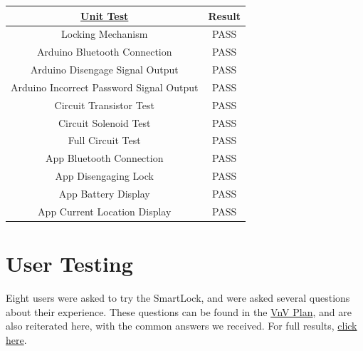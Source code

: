 \documentclass[12pt, titlepage]{article}
\begin{document}
\begin{center}

\begin{tabular}{|c|c|}
  \hline
  \textbf{\href{https://github.com/NevoAbigail/Capstone/blob/main/docs/VnVPlan/VnVPlan.pdf}{Unit Test}} & \textbf{Result} \\
  \hline
  Locking Mechanism & PASS\\
  \hline
  Arduino Bluetooth Connection & PASS\\
  \hline
  Arduino Disengage Signal Output & PASS\\
  \hline
  Arduino Incorrect Password Signal Output & PASS \\
  \hline
  Circuit Transistor Test & PASS \\
  \hline
  Circuit Solenoid Test & PASS \\
  \hline
  Full Circuit Test & PASS \\
  \hline
  App Bluetooth Connection & PASS \\
  \hline
  App Disengaging Lock & PASS \\
  \hline
  App Battery Display & PASS \\
  \hline
  App Current Location Display & PASS \\
  \hline
  
\end{tabular}
\end{center}

\section{User Testing} \label{User Testing}

Eight users were asked to try the SmartLock, and were asked several questions about their experience. These questions can be found in the \href{https://github.com/NevoAbigail/Capstone/blob/main/docs/VnVPlan/VnVPlan.pdf}{VnV Plan}, and are also reiterated here, with the common answers we received. For full results, \href{https://github.com/NevoAbigail/Capstone/blob/main/docs/VnVReport/UserTesting.xlsx}{click here}. 
\end{document}
